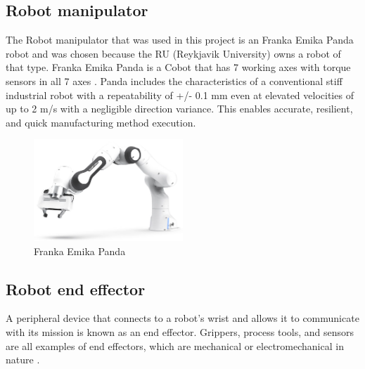 \subsection{Robot manipulator\label{subsec:robot}}
The Robot manipulator that was used in this project is an Franka Emika Panda robot and was chosen because the RU (Reykjavik University) owns a robot of that type. Franka Emika Panda is a Cobot that has 7 working axes with torque sensors in all 7 axes \cite{gmbh_franka_nodate}. Panda includes the characteristics of a conventional stiff industrial robot with a repeatability of +/- 0.1 mm even at elevated velocities of up to 2 m/s with a negligible direction variance. This enables accurate, resilient, and quick manufacturing method execution. 
\begin{figure}[h]
    \centering
    \includegraphics[width=0.5\textwidth]{graphics/frankapanda.jpg}
    \caption{Franka Emika Panda}
    \label{fig:frankaemika}
\end{figure}

\subsection{Robot end effector\label{subsec:robotend}}
A peripheral device that connects to a robot's wrist and allows it to communicate with its mission is known as an end effector. Grippers, process tools, and sensors are all examples of end effectors, which are mechanical or electromechanical in nature \cite{wilson_relative_1996}. 

